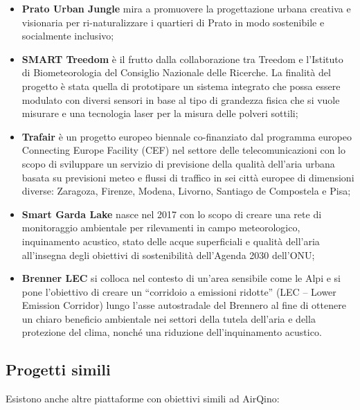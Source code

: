 \begin{itemize}
  \item \textbf{Prato Urban Jungle} \cite{urbanjungle} mira a promuovere la progettazione urbana creativa e visionaria per ri-naturalizzare i quartieri di Prato in modo sostenibile e socialmente inclusivo;
  \item \textbf{SMART Treedom} \cite{smartreedom} è il frutto dalla collaborazione tra Treedom e l’Istituto di Biometeorologia del Consiglio Nazionale delle Ricerche. La finalità del progetto è stata quella di prototipare un sistema integrato che possa essere modulato con diversi sensori in base al tipo di grandezza fisica che si vuole misurare e una tecnologia laser per la misura delle polveri sottili;
  \item \textbf{Trafair} \cite{trafair} è un progetto europeo biennale co-finanziato dal programma europeo Connecting Europe Facility (CEF) nel settore delle telecomunicazioni con lo scopo di sviluppare un servizio di previsione della qualità dell’aria urbana basata su previsioni meteo e flussi di traffico in sei città europee di dimensioni diverse: Zaragoza, Firenze, Modena, Livorno, Santiago de Compostela e Pisa;
  \item \textbf{Smart Garda Lake} \cite{garda} nasce nel 2017 con lo scopo di creare una rete di monitoraggio ambientale per rilevamenti in campo meteorologico, inquinamento acustico, stato delle acque superficiali e qualità dell’aria all’insegna degli obiettivi di sostenibilità dell’Agenda 2030 dell’ONU;
  \item \textbf{Brenner LEC} \cite{lec} si colloca nel contesto di un’area sensibile come le Alpi e si pone l’obiettivo di creare un “corridoio a emissioni ridotte” (LEC – Lower Emission Corridor) lungo l’asse autostradale del Brennero al fine di ottenere un chiaro beneficio ambientale nei settori della tutela dell’aria e della protezione del clima, nonché una riduzione dell’inquinamento acustico.
\end{itemize}

\subsection{Progetti simili}\label{ssec:competitor}
Esistono anche altre piattaforme con obiettivi simili ad AirQino:

